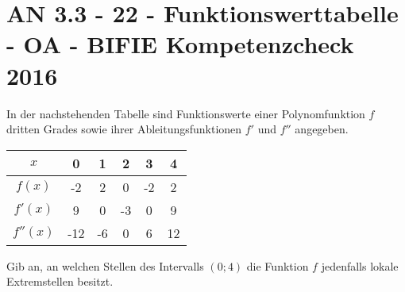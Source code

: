 \section{AN 3.3 - 22 - Funktionswerttabelle - OA - BIFIE Kompetenzcheck 2016}

\begin{beispiel}[AN 3.3]{1} %
				In der nachstehenden Tabelle sind Funktionswerte einer Polynomfunktion $f$ dritten Grades sowie ihrer Ableitungsfunktionen $f'$ und $f''$ angegeben.

\begin{center}
\begin{tabular}{|c|c|c|c|c|c|}\hline
$x$&0&1&2&3&4\\ \hline
$f(x)$&-2&2&0&-2&2\\ \hline
$f'(x)$&9&0&-3&0&9\\ \hline
$f''(x)$&-12&-6&0&6&12\\ \hline
\end{tabular}

\end{center}
Gib an, an welchen Stellen des Intervalls $\left(0;4\right)$ die Funktion $f$ jedenfalls lokale Extremstellen besitzt.


\end{beispiel}	